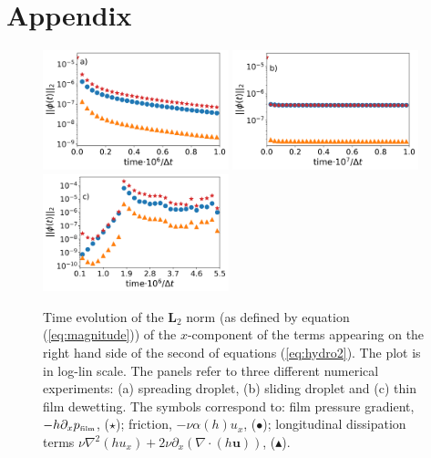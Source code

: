 \section{Appendix}\label{sec:app}
\label{app:only}
\begin{figure}
    \centering
    \includegraphics[width=0.48\textwidth]{graphics/Fig_9_1_Relax_drop_term_analysis_second_revision_without_advec_new.png}
    \includegraphics[width=0.48\textwidth]{graphics/Fig_9_2_moving_drop_term_analysis_smaller_drop_theta_5_better.png}
    \includegraphics[width=0.48\textwidth]{graphics/Fig_9_3_dewetting_term_analysis_no_legend_new_without_advec.png}
    \caption{Time evolution of the 
  $\mathbf{L}_2$ norm (as defined by equation 
  (\ref{eq:magnitude})) of the $x$-component of the terms appearing on the right hand side of the second of equations (\ref{eq:hydro2}). The plot is in log-lin scale.
  The panels refer to three different numerical experiments: (a) spreading droplet, (b) sliding droplet and (c) thin film dewetting. The symbols correspond to: 
  film pressure gradient, $-h\partial_x p_{\mbox{\tiny{film}}}$, (\textcolor{pyred}{$\star$}); friction, $-\nu \alpha(h) u_x$, (\textcolor{pyblue}{$\bullet$}); longitudinal dissipation terms 
  $\nu \nabla^2 (h u_x) + 2\nu \partial_x (\nabla \cdot (h\mathbf{u}))$, (\textcolor{pyorange}{$\blacktriangle$}).}
  \label{fig:Referee_1}
\end{figure}

